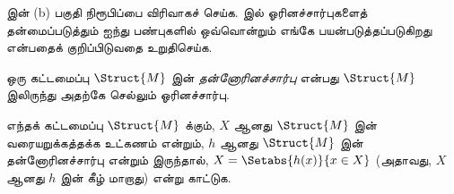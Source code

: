 \documentclass[../../../include/open-logic-section]{subfiles}
\begin{document}
\begin{prob}
 இன் (b) பகுதி நிரூபிப்பை விரிவாகச்
செய்க.  இல் ஓரினச்சார்புகளைத்
தன்மைப்படுத்தும் ஐந்து பண்புகளில் ஒவ்வொன்றும் எங்கே பயன்படுத்தப்படுகிறது
என்பதைக் குறிப்பிடுவதை உறுதிசெய்க.
\end{prob}

\begin{defn}
ஒரு கட்டமைப்பு $\Struct{M}$ இன் \emph{தன்னோரினச்சார்பு} என்பது
$\Struct{M}$ இலிருந்து அதற்கே செல்லும் ஓரினச்சார்பு.
\end{defn}

\begin{prob}
எந்தக் கட்டமைப்பு $\Struct{M}$ க்கும், $X$ ஆனது $\Struct{M}$ இன்
வரையறுக்கத்தக்க உட்கணம் என்றும், $h$ ஆனது $\Struct{M}$ இன்
தன்னோரினச்சார்பு என்றும் இருந்தால், $X
= \Setabs{h(x)}{x \in X}$ (அதாவது, $X$ ஆனது $h$ இன் கீழ் மாறாது)
என்று காட்டுக.
\end{prob}
\end{document}
